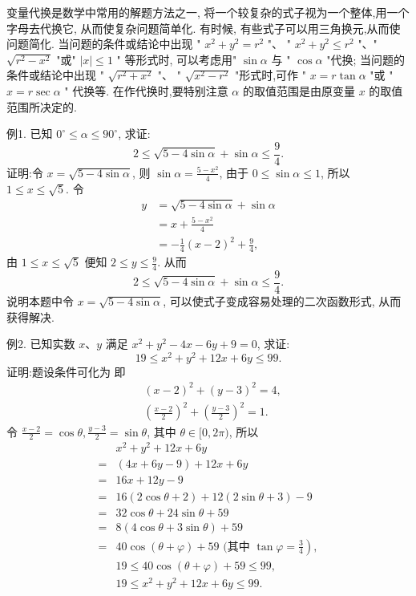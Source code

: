 
变量代换是数学中常用的解题方法之一, 将一个较复杂的式子视为一个整体,用一个字母去代换它, 从而使复杂问题简单化.
有时候, 有些式子可以用三角换元,从而使问题简化.
当问题的条件或结论中出现 " $x^2+y^2=r^2$ "、 " $x^2+y^2 \leqslant r^2$ "、" $\sqrt{r^2-x^2}$ "或" $|x| \leqslant 1$ " 等形式时, 可以考虑用" $\sin \alpha$ 与 " $\cos \alpha$ "代换; 当问题的条件或结论中出现 " $\sqrt{r^2+x^2}$ "、 " $\sqrt{x^2-r^2}$ "形式时,可作 " $x=r \tan \alpha$ "或 " $x=r \sec \alpha$ " 代换等.
在作代换时,要特别注意 $\alpha$ 的取值范围是由原变量 $x$ 的取值范围所决定的.



例1. 已知 $0^{\circ} \leqslant \alpha \leqslant 90^{\circ}$, 求证:
$$
2 \leqslant \sqrt{5-4 \sin \alpha}+\sin \alpha \leqslant \frac{9}{4} .
$$
证明:令 $x=\sqrt{5-4 \sin \alpha}$, 则 $\sin \alpha=\frac{5-x^2}{4}$, 由于 $0 \leqslant \sin \alpha \leqslant 1$, 所以 $1 \leqslant x \leqslant \sqrt{5}$. 令
$$
\begin{aligned}
y & =\sqrt{5-4 \sin \alpha}+\sin \alpha \\
& =x+\frac{5-x^2}{4} \\
& =-\frac{1}{4}(x-2)^2+\frac{9}{4},
\end{aligned}
$$
由 $1 \leqslant x \leqslant \sqrt{5}$ 便知 $2 \leqslant y \leqslant \frac{9}{4}$. 从而
$$
2 \leqslant \sqrt{5-4 \sin \alpha}+\sin \alpha \leqslant \frac{9}{4} .
$$
说明本题中令 $x=\sqrt{5-4 \sin \alpha}$, 可以使式子变成容易处理的二次函数形式, 从而获得解决.



例2. 已知实数 $x 、 y$ 满足 $x^2+y^2-4 x-6 y+9=0$, 求证:
$$
19 \leqslant x^2+y^2+12 x+6 y \leqslant 99 .
$$
证明:题设条件可化为
即
$$
\begin{aligned}
& (x-2)^2+(y-3)^2=4, \\
& \left(\frac{x-2}{2}\right)^2+\left(\frac{y-3}{2}\right)^2=1 .
\end{aligned}
$$
令 $\frac{x-2}{2}=\cos \theta, \frac{y-3}{2}=\sin \theta$, 其中 $\theta \in[0,2 \pi)$, 所以
$$
\begin{aligned}
& x^2+y^2+12 x+6 y \\
= & (4 x+6 y-9)+12 x+6 y \\
= & 16 x+12 y-9 \\
= & 16(2 \cos \theta+2)+12(2 \sin \theta+3)-9 \\
= & 32 \cos \theta+24 \sin \theta+59 \\
= & 8(4 \cos \theta+3 \sin \theta)+59 \\
= & \left.40 \cos (\theta+\varphi)+59 \text { (其中 } \tan \varphi=\frac{3}{4}\right), \\
& 19 \leqslant 40 \cos (\theta+\varphi)+59 \leqslant 99, \\
& 19 \leqslant x^2+y^2+12 x+6 y \leqslant 99 .
\end{aligned}
$$




